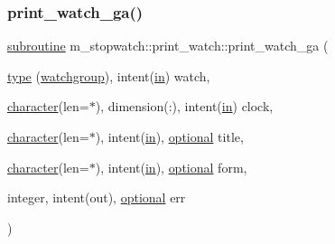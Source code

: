 \subsubsection{\texorpdfstring{print\+\_\+watch\+\_\+ga()}{print\_watch\_ga()}}
{\footnotesize\ttfamily \hyperlink{M__stopwatch_83_8txt_acfbcff50169d691ff02d4a123ed70482}{subroutine} m\+\_\+stopwatch\+::print\+\_\+watch\+::print\+\_\+watch\+\_\+ga (\begin{DoxyParamCaption}\item[{\hyperlink{stop__watch_83_8txt_a70f0ead91c32e25323c03265aa302c1c}{type} (\hyperlink{structm__stopwatch_1_1watchgroup}{watchgroup}), intent(\hyperlink{M__journal_83_8txt_afce72651d1eed785a2132bee863b2f38}{in})}]{watch,  }\item[{\hyperlink{option__stopwatch_83_8txt_abd4b21fbbd175834027b5224bfe97e66}{character}(len=$\ast$), dimension(\+:), intent(\hyperlink{M__journal_83_8txt_afce72651d1eed785a2132bee863b2f38}{in})}]{clock,  }\item[{\hyperlink{option__stopwatch_83_8txt_abd4b21fbbd175834027b5224bfe97e66}{character}(len=$\ast$), intent(\hyperlink{M__journal_83_8txt_afce72651d1eed785a2132bee863b2f38}{in}), \hyperlink{option__stopwatch_83_8txt_aa4ece75e7acf58a4843f70fe18c3ade5}{optional}}]{title,  }\item[{\hyperlink{option__stopwatch_83_8txt_abd4b21fbbd175834027b5224bfe97e66}{character}(len=$\ast$), intent(\hyperlink{M__journal_83_8txt_afce72651d1eed785a2132bee863b2f38}{in}), \hyperlink{option__stopwatch_83_8txt_aa4ece75e7acf58a4843f70fe18c3ade5}{optional}}]{form,  }\item[{integer, intent(out), \hyperlink{option__stopwatch_83_8txt_aa4ece75e7acf58a4843f70fe18c3ade5}{optional}}]{err }\end{DoxyParamCaption})\hspace{0.3cm}{\ttfamily [private]}}

\mbox{\label{interfacem__stopwatch_1_1print__watch_a2621eb8f8a5fcfedb8631f191af12e46}} 

